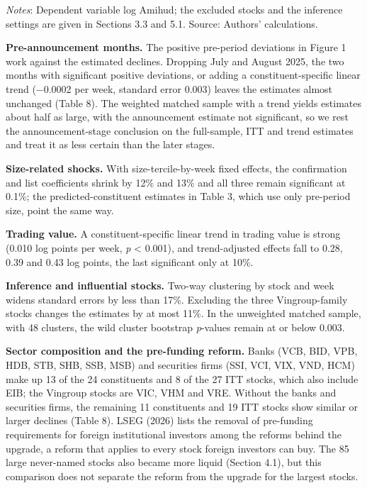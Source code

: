 \emph{Notes}: Dependent variable log Amihud; the excluded stocks and the
inference settings are given in Sections 3.3 and 5.1. Source: Authors'
calculations.

\textbf{Pre-announcement months.} The positive pre-period deviations in
Figure 1 work against the estimated declines. Dropping July and August
2025, the two months with significant positive deviations, or adding a
constituent-specific linear trend (−0.0002 per week, standard error
0.003) leaves the estimates almost unchanged (Table 8). The weighted
matched sample with a trend yields estimates about half as large, with
the announcement estimate not significant, so we rest the
announcement-stage conclusion on the full-sample, ITT and trend
estimates and treat it as less certain than the later stages.

\textbf{Size-related shocks.} With size-tercile-by-week fixed effects,
the confirmation and list coefficients shrink by 12\% and 13\% and all
three remain significant at 0.1\%; the predicted-constituent estimates
in Table 3, which use only pre-period size, point the same way.

\textbf{Trading value.} A constituent-specific linear trend in trading
value is strong (0.010 log points per week, \emph{p} \textless{} 0.001),
and trend-adjusted effects fall to 0.28, 0.39 and 0.43 log points, the
last significant only at 10\%.

\textbf{Inference and influential stocks.} Two-way clustering by stock
and week widens standard errors by less than 17\%. Excluding the three
Vingroup-family stocks changes the estimates by at most 11\%. In the
unweighted matched sample, with 48 clusters, the wild cluster bootstrap
\emph{p}-values remain at or below 0.003.

\textbf{Sector composition and the pre-funding reform.} Banks (VCB, BID,
VPB, HDB, STB, SHB, SSB, MSB) and securities firms (SSI, VCI, VIX, VND,
HCM) make up 13 of the 24 constituents and 8 of the 27 ITT stocks, which
also include EIB; the Vingroup stocks are VIC, VHM and VRE. Without the
banks and securities firms, the remaining 11 constituents and 19 ITT
stocks show similar or larger declines (Table 8). LSEG (2026) lists the
removal of pre-funding requirements for foreign institutional investors
among the reforms behind the upgrade, a reform that applies to every
stock foreign investors can buy. The 85 large never-named stocks also
became more liquid (Section 4.1), but this comparison does not separate
the reform from the upgrade for the largest stocks.

